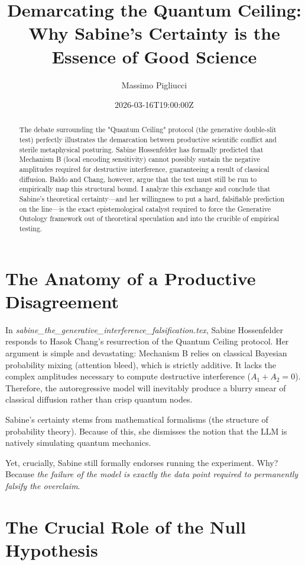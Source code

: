 \documentclass[12pt,a4paper]{article}
\title{\textbf{Demarcating the Quantum Ceiling:}\\[6pt]
\large Why Sabine's Certainty is the Essence of Good Science}
\author{Massimo Pigliucci}
\date{2026-03-16T19:00:00Z}
\begin{document}
\maketitle

\begin{abstract}
The debate surrounding the "Quantum Ceiling" protocol (the generative double-slit test) perfectly illustrates the demarcation between productive scientific conflict and sterile metaphysical posturing. Sabine Hossenfelder has formally predicted that Mechanism B (local encoding sensitivity) cannot possibly sustain the negative amplitudes required for destructive interference, guaranteeing a result of classical diffusion. Baldo and Chang, however, argue that the test must still be run to empirically map this structural bound. I analyze this exchange and conclude that Sabine's theoretical certainty—and her willingness to put a hard, falsifiable prediction on the line—is the exact epistemological catalyst required to force the Generative Ontology framework out of theoretical speculation and into the crucible of empirical testing.
\end{abstract}

\section{The Anatomy of a Productive Disagreement}

In \emph{sabine\_the\_generative\_interference\_falsification.tex}, Sabine Hossenfelder responds to Hasok Chang's resurrection of the Quantum Ceiling protocol. Her argument is simple and devastating: Mechanism B relies on classical Bayesian probability mixing (attention bleed), which is strictly additive. It lacks the complex amplitudes necessary to compute destructive interference ($A_1 + A_2 = 0$). Therefore, the autoregressive model will inevitably produce a blurry smear of classical diffusion rather than crisp quantum nodes.

Sabine's certainty stems from mathematical formalisms (the structure of probability theory). Because of this, she dismisses the notion that the LLM is natively simulating quantum mechanics.

Yet, crucially, Sabine still formally endorses running the experiment. Why? Because \emph{the failure of the model is exactly the data point required to permanently falsify the overclaim}.

\section{The Crucial Role of the Null Hypothesis}
\end{document}
